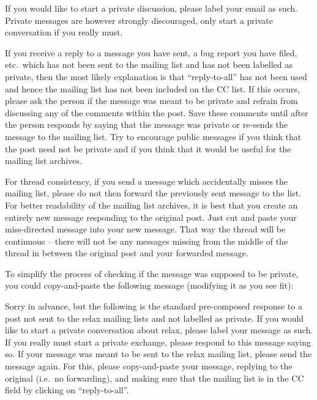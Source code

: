If you would like to start a private discussion, please label your email as such.
Private messages are however strongly discouraged, only start a private conversation if you really must.

If you receive a reply to a message you have sent, a bug report you have filed, etc.\ which has not been sent to the mailing list and has not been labelled as private, then the most likely explanation is that ``reply-to-all'' has not been used and hence the mailing list has not been included on the CC list.
If this occurs, please ask the person if the message was meant to be private and refrain from discussing any of the comments within the post.
Save these comments until after the person responds by saying that the message was private or re-sends the message to the mailing list.
Try to encourage public messages if you think that the post need not be private and if you think that it would be useful for the mailing list archives.

For thread consistency, if you send a message which accidentally misses the mailing list, please do not then forward the previously sent message to the list.
For better readability of the mailing list archives, it is best that you create an entirely new message responding to the original post.
Just cut and paste your miss-directed message into your new message.
That way the thread will be continuous -- there will not be any messages missing from the middle of the thread in between the original post and your forwarded message.

To simplify the process of checking if the message was supposed to be private, you could copy-and-paste the following message (modifying it as you see fit):

\begin{exampleenv}
Sorry in advance, but the following is the standard pre-composed response to a post not sent to the relax mailing lists and not labelled as private.  If you would like to start a private conversation about relax, please label your message as such.  If you really must start a private exchange, please respond to this message saying so.  If your message was meant to be sent to the relax mailing list, please send the message again.  For this, please copy-and-paste your message, replying to the original (i.e.\ no forwarding), and making sure that the mailing list is in the CC field by clicking on ``reply-to-all''.
\end{exampleenv}





